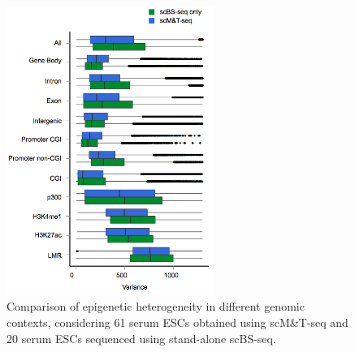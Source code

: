 
\ifpdf
    \graphicspath{{Chapter3/mt/Figs/Raster/}{Chapter3/mt/Figs/PDF/}{Chapter3/mt/Figs/}}
\else
    \graphicspath{{Chapter3/mt/Figs/Vector/}{Chapter3/mt/Figs/}}
\fi

\begin{figure}[htbp!]
\centering
\includegraphics[width=0.6\textwidth]{var}
\caption[Comparision of epigenetic heterogeneity in cells profiled using scM\&T-seq and scBS-seq.]{Comparison of epigenetic heterogeneity in different genomic contexts, considering 61 serum ESCs obtained using scM\&T-seq and 20 serum ESCs sequenced using stand-alone scBS-seq.}
\label{fig:mt_var}
\end{figure}

